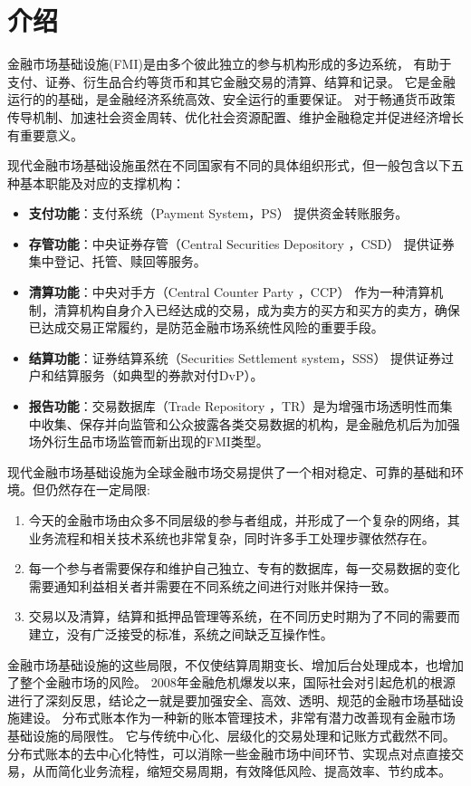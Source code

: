 \section{介绍}

金融市场基础设施(FMI)是由多个彼此独立的参与机构形成的多边系统，
有助于支付、证券、衍生品合约等货币和其它金融交易的清算、结算和记录。
它是金融运行的的基础，是金融经济系统高效、安全运行的重要保证。
对于畅通货币政策传导机制、加速社会资金周转、优化社会资源配置、维护金融稳定并促进经济增长有重要意义。

现代金融市场基础设施虽然在不同国家有不同的具体组织形式，但一般包含以下五种基本职能及对应的支撑机构：

\begin{itemize}
    \item [\dag] \textbf{支付功能}：支付系统（Payment System，PS） 提供资金转账服务。
    \item [\dag] \textbf{存管功能}：中央证券存管（Central Securities Depository ，CSD） 提供证券集中登记、托管、赎回等服务。
    \item [\dag] \textbf{清算功能}：中央对手方（Central Counter Party ，CCP） 作为一种清算机制，清算机构自身介入已经达成的交易，成为卖方的买方和买方的卖方，确保已达成交易正常履约，是防范金融市场系统性风险的重要手段。
    \item [\dag] \textbf{结算功能}：证券结算系统（Securities Settlement system，SSS） 提供证券过户和结算服务（如典型的券款对付DvP）。
    \item [\dag] \textbf{报告功能}：交易数据库（Trade Repository ，TR）是为增强市场透明性而集中收集、保存并向监管和公众披露各类交易数据的机构，是金融危机后为加强场外衍生品市场监管而新出现的FMI类型。
\end{itemize}

现代金融市场基础设施为全球金融市场交易提供了一个相对稳定、可靠的基础和环境。但仍然存在一定局限: 
\begin{enumerate}
    \item 今天的金融市场由众多不同层级的参与者组成，并形成了一个复杂的网络，其业务流程和相关技术系统也非常复杂，同时许多手工处理步骤依然存在。
    \item 每一个参与者需要保存和维护自己独立、专有的数据库，每一交易数据的变化需要通知利益相关者并需要在不同系统之间进行对账并保持一致。
    \item 交易以及清算，结算和抵押品管理等系统，在不同历史时期为了不同的需要而建立，没有广泛接受的标准，系统之间缺乏互操作性。
\end{enumerate}
金融市场基础设施的这些局限，不仅使结算周期变长、增加后台处理成本，也增加了整个金融市场的风险。
2008年金融危机爆发以来，国际社会对引起危机的根源进行了深刻反思，结论之一就是要加强安全、高效、透明、规范的金融市场基础设施建设。
分布式账本作为一种新的账本管理技术，非常有潜力改善现有金融市场基础设施的局限性。
它与传统中心化、层级化的交易处理和记账方式截然不同。
分布式账本的去中心化特性，可以消除一些金融市场中间环节、实现点对点直接交易，从而简化业务流程，缩短交易周期，有效降低风险、提高效率、节约成本。

